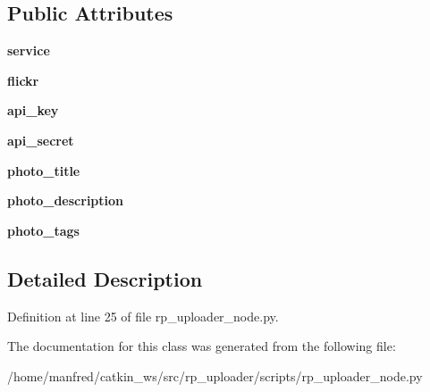 \subsection*{\-Public \-Attributes}
\begin{DoxyCompactItemize}
\item 
\hypertarget{classrp__uploader__node_1_1_r_p_uploader_node_adbd84cc1b25a606b67885d35ab392fcc}{{\bfseries service}}\label{classrp__uploader__node_1_1_r_p_uploader_node_adbd84cc1b25a606b67885d35ab392fcc}

\item 
\hypertarget{classrp__uploader__node_1_1_r_p_uploader_node_af51310664e49fff5644ecf23f3b11478}{{\bfseries flickr}}\label{classrp__uploader__node_1_1_r_p_uploader_node_af51310664e49fff5644ecf23f3b11478}

\item 
\hypertarget{classrp__uploader__node_1_1_r_p_uploader_node_aef6db8c0c4eb5fc5ca331e07ca8c99a8}{{\bfseries api\-\_\-key}}\label{classrp__uploader__node_1_1_r_p_uploader_node_aef6db8c0c4eb5fc5ca331e07ca8c99a8}

\item 
\hypertarget{classrp__uploader__node_1_1_r_p_uploader_node_a784e11af8c75708dee9362482a80a453}{{\bfseries api\-\_\-secret}}\label{classrp__uploader__node_1_1_r_p_uploader_node_a784e11af8c75708dee9362482a80a453}

\item 
\hypertarget{classrp__uploader__node_1_1_r_p_uploader_node_a3fa6a0fafb47af4f61bedbe1e6873356}{{\bfseries photo\-\_\-title}}\label{classrp__uploader__node_1_1_r_p_uploader_node_a3fa6a0fafb47af4f61bedbe1e6873356}

\item 
\hypertarget{classrp__uploader__node_1_1_r_p_uploader_node_a523226496f93459d266e77a3b84c8ef1}{{\bfseries photo\-\_\-description}}\label{classrp__uploader__node_1_1_r_p_uploader_node_a523226496f93459d266e77a3b84c8ef1}

\item 
\hypertarget{classrp__uploader__node_1_1_r_p_uploader_node_a66f1b9831c917c10cf7bc108c8bf8c29}{{\bfseries photo\-\_\-tags}}\label{classrp__uploader__node_1_1_r_p_uploader_node_a66f1b9831c917c10cf7bc108c8bf8c29}

\end{DoxyCompactItemize}


\subsection{\-Detailed \-Description}


\-Definition at line 25 of file rp\-\_\-uploader\-\_\-node.\-py.



\-The documentation for this class was generated from the following file\-:\begin{DoxyCompactItemize}
\item 
/home/manfred/catkin\-\_\-ws/src/rp\-\_\-uploader/scripts/rp\-\_\-uploader\-\_\-node.\-py\end{DoxyCompactItemize}
